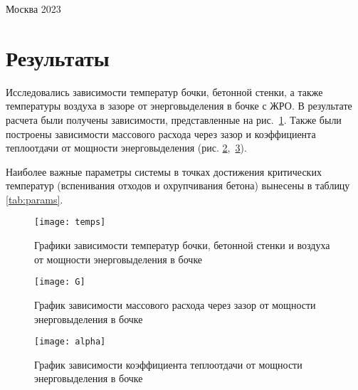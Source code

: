 \vfill

\begin{center}
	Москва 2023
\end{center}

\newpage

\section{Результаты}

Исследовались зависимости температур бочки, бетонной стенки, а также температуры воздуха в зазоре от энерговыделения в бочке с ЖРО. В результате расчета были получены зависимости, представленные на рис.~\ref{fig:temps}. Также были построены зависимости массового расхода через зазор и коэффициента теплоотдачи от мощности энерговыделения (рис. \ref{fig:G},~\ref{fig:alpha}).

Наиболее важные параметры системы в точках достижения критических температур (вспенивания отходов и охрупчивания бетона) вынесены в таблицу \ref{tab:params}.

\begin{figure}[h]
	\centering\texttt{[image: temps]}
	\caption{Графики зависимости температур бочки, бетонной стенки и воздуха от мощности энерговыделения в бочке} \label{fig:temps}
\end{figure}

\begin{figure}[h]
	\centering\texttt{[image: G]}
	\caption{График зависимости массового расхода через зазор от мощности энерговыделения в бочке} \label{fig:G}
\end{figure}

\begin{figure}[h!]
	\centering\texttt{[image: alpha]}
	\caption{График зависимости коэффициента теплоотдачи от мощности энерговыделения в бочке} \label{fig:alpha}
\end{figure}


